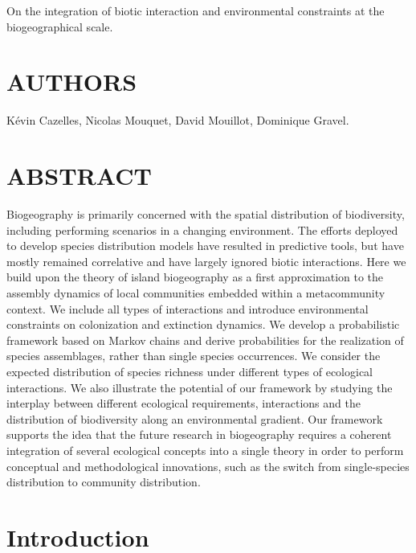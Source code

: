 On the integration of biotic interaction and environmental constraints at the biogeographical scale.

\section{AUTHORS}

Kévin Cazelles, Nicolas Mouquet, David Mouillot, Dominique Gravel.


\section{ABSTRACT}

Biogeography is primarily concerned with the spatial distribution of biodiversity, including performing scenarios in a changing environment. The efforts deployed to develop species distribution models have resulted in predictive tools, but have mostly remained correlative and have largely ignored biotic interactions. Here we build upon the theory of island biogeography as a first approximation to the assembly dynamics of local communities embedded within a metacommunity context. We include all types of interactions and introduce environmental constraints on colonization and extinction dynamics. We develop a probabilistic framework based on Markov chains and derive probabilities for the realization of species assemblages, rather than single species occurrences. We consider the expected distribution of species richness under different types of ecological interactions. We also illustrate the potential of our framework by studying the interplay between different ecological requirements, interactions and the distribution of biodiversity along an environmental gradient. Our framework supports the idea that the future research in biogeography requires a coherent integration of several ecological concepts into a single theory in order to perform conceptual and methodological innovations, such as the switch from single-species distribution to community distribution.


\section{Introduction}

